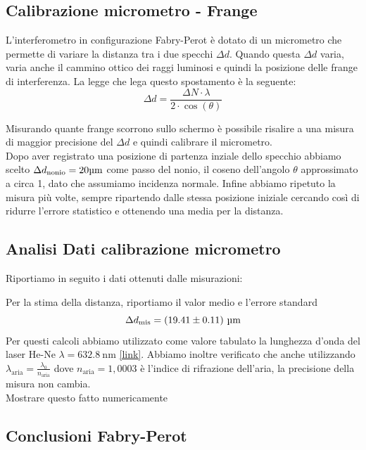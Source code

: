 \documentclass[letterpaper,12pt]{article}
\begin{document}
\subsection{Calibrazione micrometro - Frange}
L'interferometro in configurazione Fabry-Perot è dotato di un micrometro che permette 
di variare la distanza tra i due specchi $\Delta d$.
Quando questa $\Delta d$ varia, varia anche il cammino ottico dei raggi luminosi e quindi la posizione delle frange di interferenza.
La legge che lega questo spostamento è la seguente:
    \begin{equation}
        \Delta d = \frac{\Delta N \cdot \lambda}{2 \cdot \cos(\theta)}
        \label{eq:micrometro}
    \end{equation}

Misurando quante frange scorrono sullo schermo è possibile risalire a una misura di maggior precisione
del $\Delta d$ e quindi calibrare il micrometro.\\
Dopo aver registrato una posizione di partenza inziale dello specchio abbiamo scelto $\Delta d_\text{nonio} = 20\text{\SIUnitSymbolMicro m}$ come passo del nonio,
 il coseno dell'angolo $\theta$ approssimato a circa 1, dato che assumiamo incidenza normale.
Infine abbiamo ripetuto la misura più volte, sempre ripartendo
dalle stessa posizione iniziale cercando così di ridurre l'errore 
statistico e ottenendo una media per la distanza.


\subsection{Analisi Dati calibrazione micrometro}
Riportiamo in seguito i dati ottenuti dalle misurazioni:


Per la stima della distanza, riportiamo il valor medio e l'errore standard 
$$\Delta d_\text{mis} = (19.41 \pm0.11)\ \text{\SIUnitSymbolMicro m} $$
Per questi calcoli abbiamo utilizzato come valore tabulato la lunghezza d'onda del laser He-Ne $\lambda = \SI{632.8}{\nano\meter}$ \href{https://www.pasco.com/products/lab-apparatus/light-and-optics/advanced-optics/os-9255}{[link]}.
Abbiamo inoltre verificato che anche utilizzando $\lambda_\text{aria} = \frac{\lambda_0}{n_\text{aria}}$ dove $n_\text{aria} = 1,0003$ 
è l'indice di rifrazione dell'aria, la precisione della misura non cambia.\\
Mostrare questo fatto numericamente

\subsection{Conclusioni Fabry-Perot}
\end{document}
